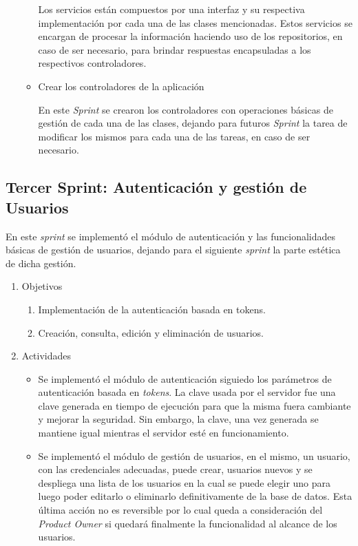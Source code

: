 \begin{enumerate}
\begin{itemize}
            Los servicios están compuestos por una interfaz y su respectiva implementación por cada una de las clases mencionadas. Estos servicios se encargan de procesar la información haciendo uso de los repositorios, en caso de ser necesario, para brindar respuestas encapsuladas a los respectivos controladores.
            
            \item Crear los controladores de la aplicación
            
            En este \textit{Sprint} se crearon los controladores con operaciones básicas de gestión de cada una de las clases, dejando para futuros \textit{Sprint} la tarea de modificar los mismos para cada una de las tareas, en caso de ser necesario.
            
        \end{itemize}
    \end{enumerate}
        
        
    \subsection{Tercer Sprint: Autenticación y gestión de Usuarios}
    
    En este \textit{sprint} se implementó el módulo de autenticación y las funcionalidades básicas de gestión de usuarios, dejando para el siguiente \textit{sprint} la parte estética de dicha gestión.
    
    \begin{enumerate}
        \item Objetivos
        \begin{enumerate}
            \item Implementación de la autenticación basada en tokens.
            \item Creación, consulta, edición y eliminación de usuarios.
        \end{enumerate}
        \item Actividades
        \begin{itemize}
            \item Se implementó el módulo de autenticación siguiedo los parámetros de autenticación basada en \textit{tokens}. La clave usada por el servidor fue una clave generada en tiempo de ejecución para que la misma fuera cambiante y mejorar la seguridad. Sin embargo, la clave, una vez generada se mantiene igual mientras el servidor esté en funcionamiento.
            
            \item Se implementó el módulo de gestión de usuarios, en el mismo, un usuario, con las credenciales adecuadas, puede crear, usuarios nuevos y se despliega una lista de los usuarios en la  cual se puede elegir uno para luego poder editarlo o eliminarlo definitivamente de la base de datos. Esta última acción no es reversible por lo cual queda a consideración del \textit{Product Owner} si quedará finalmente la funcionalidad al alcance de los usuarios.
        \end{itemize}   
    \end{enumerate}
             
